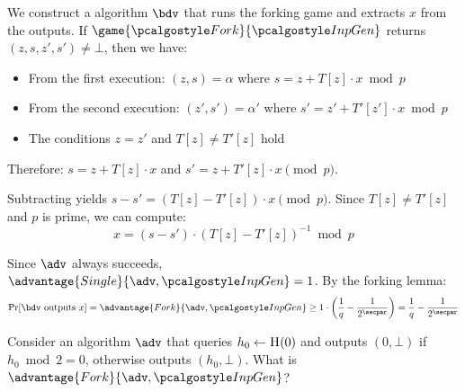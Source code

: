 \ifsolutions
\begin{mysolution}
  We construct a \ppt algorithm $\bdv$ that runs the forking game and extracts $x$ from the outputs.
  If $\game{\algo{Fork}}{\algo{InpGen}}$ returns $(z, s, z', s') \neq \bot$, then we have:
  \begin{itemize}
    \item From the first execution: $(z, s) = \alpha$ where $s = z + T[z] \cdot x \bmod p$
    \item From the second execution: $(z', s') = \alpha'$ where $s' = z' + T'[z'] \cdot x \bmod p$
    \item The conditions $z = z'$ and $T[z] \neq T'[z]$ hold
  \end{itemize}
  
  Therefore: $s = z + T[z] \cdot x$ and $s' = z + T'[z] \cdot x \pmod{p}$.
  
  Subtracting yields $s - s' = (T[z] - T'[z]) \cdot x \pmod{p}$. Since $T[z] \neq T'[z]$ and $p$ is prime, we can compute:
  \[
  x = (s - s') \cdot (T[z] - T'[z])^{-1} \bmod p
  \]
  
  Since $\adv$ always succeeds, $\advantage{Single}{\adv, \algo{InpGen}} = 1$. By the forking lemma:
  \[
  \Pr[\bdv \text{ outputs } x] = \advantage{Fork}{\adv, \algo{InpGen}} \geq 1 \cdot \left(\frac{1}{q} - \frac{1}{2^\secpar}\right) = \frac{1}{q} - \frac{1}{2^\secpar}
  \]
\end{mysolution}
\fi

\begin{exercise}
  Consider an algorithm $\adv$ that queries $h_0 \gets {\normalfont\textsc{H}}(0)$ and outputs $(0, \bot)$ if $h_0 \bmod 2 = 0$, otherwise outputs $(h_0, \bot)$. What is $\advantage{Fork}{\adv, \algo{InpGen}}$?
\end{exercise}

